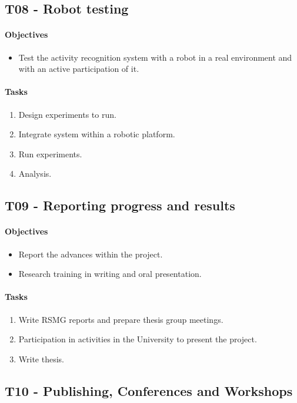 \subsection*{T08 - Robot testing}
\paragraph{Objectives}
\begin{itemize}
\item Test the activity recognition system with a robot in a real environment and with an active participation of it.
\end{itemize}
\paragraph{Tasks}
\begin{enumerate}[label= T08-\Alph*:]
\item Design experiments to run.
\item Integrate system within a robotic platform. 
\item Run experiments.
\item Analysis.
\end{enumerate}

\subsection*{T09 - Reporting progress and results}
\paragraph{Objectives}
\begin{itemize}
\item Report the advances within the project.
\item Research training in writing and oral presentation.
\end{itemize}
\paragraph{Tasks}
\begin{enumerate}[label= T09-\Alph*:]
\item Write RSMG reports and prepare thesis group meetings.
\item Participation in activities in the University to present the project.
\item Write thesis.
\end{enumerate}

\subsection*{T10 - Publishing, Conferences and Workshops}

